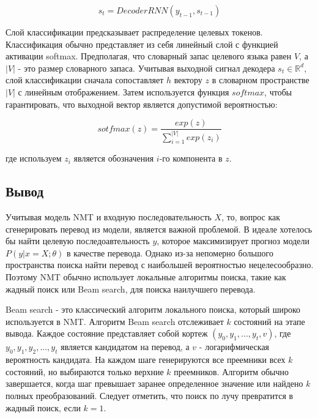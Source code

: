 	$$
	    s_t = DecoderRNN(y_{t-1}, s_{t-1})
	$$
	
	Слой классификации предсказывает распределение целевых токенов. Классификация обычно представляет из себя линейный слой с функцией активации softmax. Предполагая, что словарный запас целевого языка равен $V$, а $|V|$ - это размер словарного запаса. Учитывая выходной сигнал декодера $s_t \in \mathbb{R}^d$, слой классификации сначала сопоставляет $h$ вектору $z$ в словарном пространстве $|V|$ с линейным отображением. Затем используется функция $softmax$, чтобы гарантировать, что выходной вектор является допустимой вероятностью:
	
	$$
	    sotfmax(z) = \frac{exp(z)}{\sum_{i = 1}^{|V|}exp(z_i)}
	$$
	
	где используем $z_i$ является обозначения $i$-го компонента в $z$.
	
	\subsection{Вывод}
	
	Учитывая модель NMT и входную последовательность $X$, то, вопрос как сгенерировать перевод из модели, является важной проблемой. В идеале хотелось бы найти целевую последоавтельность $y$, которое максимизирует прогноз модели $P(y|x=X;\theta)$ в качестве перевода. Однако из-за непомерно большого пространства поиска найти перевод с наибольшей вероятностью нецелесообразно. Поэтому NMT обычно использует локальные алгоритмы поиска, такие как жадный поиск или Beam search, для поиска наилучшего перевода.
	
	Beam search - это классический алгоритм локального поиска, который широко используется в NMT. Алгоритм Beam search отслеживает $k$ состояний на этапе вывода. Каждое состояние представляет собой кортеж $(y_0, y_1, ..., y_t, v)$, где $y_0, y_1, y_2, ..., y_t$ является кандидатом на перевод, а $v$ - логарифмическая вероятность кандидата. На каждом шаге генерируются все преемники всех $k$ состояний, но выбираются только верхние $k$ преемников. Алгоритм обычно завершается, когда шаг превышает заранее определенное значение или найдено $k$ полных преобразований. Следует отметить, что поиск по лучу превратится в жадный поиск, если $k = 1$.
	
